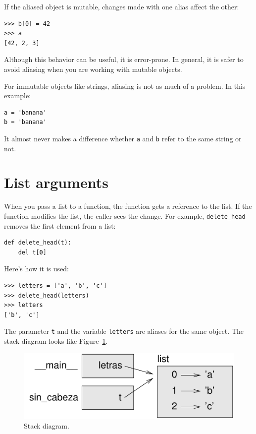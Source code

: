 \documentclass[10pt]{book}
\begin{document}
If the aliased object is mutable, changes made with one alias affect
the other:

\begin{verbatim}
>>> b[0] = 42
>>> a
[42, 2, 3]
\end{verbatim}
%
Although this behavior can be useful, it is error-prone.  In general,
it is safer to avoid aliasing when you are working with mutable
objects.

For immutable objects like strings, aliasing is not as much of a
problem.  In this example:

\begin{verbatim}
a = 'banana'
b = 'banana'
\end{verbatim}
%
It almost never makes a difference whether {\tt a} and {\tt b} refer
to the same string or not.


\section{List arguments}
\label{list.arguments}

When you pass a list to a function, the function gets a reference to
the list.  If the function modifies the list, the caller sees
the change.  For example, \verb"delete_head" removes the first element
from a list:

\begin{verbatim}
def delete_head(t):
    del t[0]
\end{verbatim}
%
Here's how it is used:

\begin{verbatim}
>>> letters = ['a', 'b', 'c']
>>> delete_head(letters)
>>> letters
['b', 'c']
\end{verbatim}
%
The parameter {\tt t} and the variable {\tt letters} are
aliases for the same object.  The stack diagram looks like
Figure~\ref{fig.stack5}.

\begin{figure}
\centerline
{\includegraphics[scale=0.8]{figs/stack5.pdf}}
\caption{Stack diagram.}
\label{fig.stack5}
\end{figure}
\end{document}
